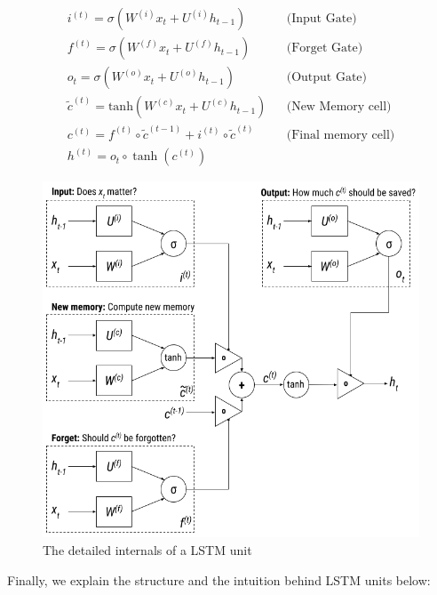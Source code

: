 \begin{equation}
\begin{aligned}
    i^{(t)} = \sigma(W^{(i)}x_t + U^{(i)}h_{t-1}) && \text{(Input \ Gate)} \\
    f^{(t)} = \sigma(W^{(f)}x_t + U^{(f)}h_{t-1}) && \text{(Forget \ Gate)} \\
    o_t = \sigma(W^{(o)}x_t + U^{(o)}h_{t-1}) && \text{(Output \ Gate)} \\
    \widetilde{c}^{(t)} = \text{tanh}(W^{(c)}x_t + U^{(c)}h_{t-1}) && \text{(New \ Memory \ cell)} \\
    c^{(t)} = f^{(t)} \circ \widetilde{c}^{(t-1)} + i^{(t)} \circ \widetilde{c}^{(t)} && \text{(Final \ memory \ cell)} \\
    h^{(t)} = o_t \circ \tanh(c^{(t)})
\end{aligned}
\end{equation}


\begin{figure}[!htb]
    \centering
    \includegraphics[scale=0.55]{Figures/lstm-unit.png}
    \caption{The detailed internals of a LSTM unit}
    \label{fig:lstmunit}
\end{figure}

Finally, we explain the structure and the intuition behind LSTM units below:

